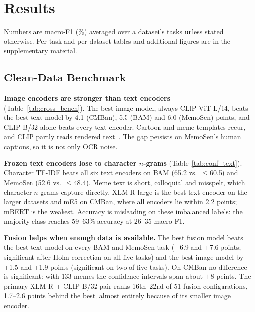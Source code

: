 \section{Results}
\label{sec:results}

Numbers are macro-F1 (\%) averaged over a dataset's tasks unless stated otherwise. Per-task and per-dataset tables
and additional figures are in the supplementary material.



\subsection{Clean-Data Benchmark}
\label{sec:results:benchmark}

\textbf{Image encoders are stronger than text encoders} (Table~\ref{tab:cross_bench}). The best image model, always
CLIP ViT-L/14, beats the best text model by 4.1 (CMBan), 5.5 (BAM) and 6.0 (MemoSen) points, and CLIP-B/32 alone beats
every text encoder. Cartoon and meme templates recur, and CLIP partly reads rendered text~\cite{goh2021multimodal}.
The gap persists on MemoSen's human captions, so it is not only OCR noise.

\textbf{Frozen text encoders lose to character $n$-grams} (Table~\ref{tab:conf_text}). Character TF-IDF beats all
six text encoders on BAM (65.2 vs.\ $\leq$60.5) and MemoSen (52.6 vs.\ $\leq$48.4). Meme text is short, colloquial
and misspelt, which character $n$-grams capture directly. XLM-R-large is the best text encoder on the larger datasets
and mE5 on CMBan, where all encoders lie within 2.2 points; mBERT is the weakest. Accuracy is misleading on these
imbalanced labels: the majority class reaches 59--63\% accuracy at 26--35 macro-F1.



\textbf{Fusion helps when enough data is available.} The best fusion model beats the best text model on every BAM
and MemoSen task (+6.9 and +7.6 points; significant after Holm correction on all five tasks) and the best image model
by +1.5 and +1.9 points (significant on two of five tasks). On CMBan no difference is significant: with 133 memes the
confidence intervals span about $\pm$8 points. The primary XLM-R + CLIP-B/32 pair ranks 16th--22nd of 51 fusion
configurations, 1.7--2.6 points behind the best, almost entirely because of its smaller image encoder.



